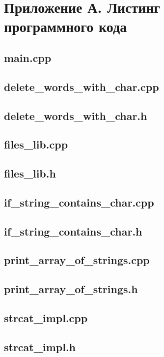 \documentclass[12pt,a4paper]{article}  %
\begin{document}
	\newpage
	\section*{Приложение А. Листинг программного кода}

	\subsection*{main.cpp}
	
	
	\newpage
	\subsection*{delete\_words\_with\_char.cpp}
	
	
	\newpage
	\subsection*{delete\_words\_with\_char.h}
	
	
	\newpage
	\subsection*{files\_lib.cpp}
	
	
	\newpage
	\subsection*{files\_lib.h}
	
	
	\newpage
	\subsection*{if\_string\_contains\_char.cpp}
	
	
	\newpage
	\subsection*{if\_string\_contains\_char.h}
	
	
	\newpage
	\subsection*{print\_array\_of\_strings.cpp}
	
	
	\newpage
	\subsection*{print\_array\_of\_strings.h}
	
	
	\newpage
	\subsection*{strcat\_impl.cpp}
	
	
	\newpage
	\subsection*{strcat\_impl.h}
	
	
\end{document}

